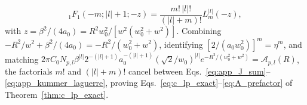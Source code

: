 \documentclass[aps,pra,reprint,amsmath,amssymb,floatfix,longbibliography]{revtex4-2}
\providecommand{\abs}[1]{\lvert#1\rvert}
\begin{document}
\begin{equation}
{_1F_1}(-m; \abs{l}+1; -z) = \frac{m!\,\abs{l}!}{(\abs{l}+m)!} L_m^{\abs{l}}(-z),
\label{eq:app_kummer_laguerre}
\end{equation}
with $z = \beta^2/(4a_0) = R^2 w_0^2/[w^2(w_0^2+w^2)]$. Combining $-R^2/w^2 + \beta^2/(4a_0) = -R^2/(w_0^2 + w^2)$, identifying $[2/(a_0 w_0^2)]^m = \eta^m$, and matching $2\pi C_0 N_{p,l}\beta^{\abs{l}} 2^{-(\abs{l}+1)} a_0^{-(\abs{l}+1)} (\sqrt{2}/w_0)^{\abs{l}} e^{-R^2/(w_0^2+w^2)} = \mathcal{A}_{p,l}(R)$, the factorials $m!$ and $(\abs{l}+m)!$ cancel between Eqs.~\eqref{eq:app_J_sum}--\eqref{eq:app_kummer_laguerre}, proving Eqs.~\eqref{eq:c_lp_exact}--\eqref{eq:A_prefactor} of Theorem~\ref{thm:c_lp_exact}.


\end{document}
